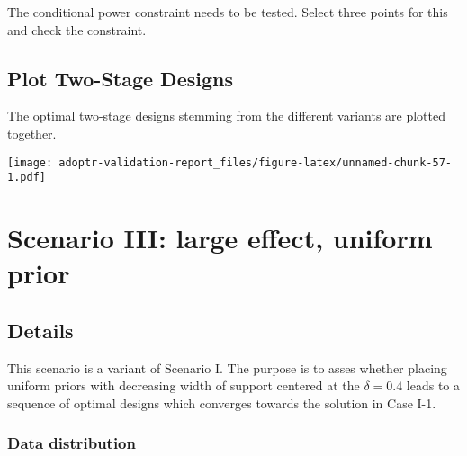 \documentclass[]{book}
\newenvironment{Shaded}{\begin{snugshade}}{\end{snugshade}}
\newcommand{\ControlFlowTok}[1]{\textcolor[rgb]{0.13,0.29,0.53}{\textbf{#1}}}
\newcommand{\DecValTok}[1]{\textcolor[rgb]{0.00,0.00,0.81}{#1}}
\newcommand{\FloatTok}[1]{\textcolor[rgb]{0.00,0.00,0.81}{#1}}
\newcommand{\KeywordTok}[1]{\textcolor[rgb]{0.13,0.29,0.53}{\textbf{#1}}}
\newcommand{\NormalTok}[1]{#1}
\newcommand{\OperatorTok}[1]{\textcolor[rgb]{0.81,0.36,0.00}{\textbf{#1}}}
\newcommand{\StringTok}[1]{\textcolor[rgb]{0.31,0.60,0.02}{#1}}
\begin{document}
The conditional power constraint needs to be tested.
Select three points for this and check the constraint.

\begin{Shaded}
\end{Shaded}

\hypertarget{plot-two-stage-designs-1}{%
\section{Plot Two-Stage Designs}\label{plot-two-stage-designs-1}}

The optimal two-stage designs stemming from the different variants
are plotted together.

\texttt{[image: adoptr-validation-report\_files/figure-latex/unnamed-chunk-57-1.pdf]}

\hypertarget{scenarioIII}{%
\chapter{Scenario III: large effect, uniform prior}\label{scenarioIII}}

\hypertarget{details-2}{%
\section{Details}\label{details-2}}

This scenario is a variant of Scenario I.
The purpose is to asses whether placing uniform priors with decreasing
width of support centered at the \(\delta=0.4\) leads to a sequence of
optimal designs which converges towards the solution in Case I-1.

\hypertarget{data-distribution-2}{%
\subsection{Data distribution}\label{data-distribution-2}}
\end{document}
